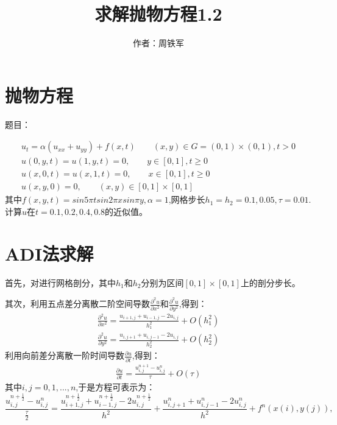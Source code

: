 \documentclass[12pt,a4paper]{article}
\title{求解抛物方程1.2}
\author{作者：周铁军}
\date{\chntoday}
\begin{document}
\maketitle
\newpage
\section{抛物方程}
 题目：
 
 \begin{equation}
  \begin{array}{l}{ u_t = \alpha(u_{xx}+u_{yy})+f(x,t) \qquad (x,y) \in G=(0,1)\times(0,1),t > 0}\\
  {u(0,y,t) = u(1,y,t)=0,\qquad y \in [0,1],t \geq 0 }\\
  {u(x,0,t) = u(x,1,t)=0,\qquad x \in [0,1],t \geq 0}\\
  {u(x,y,0)=0,\qquad (x,y) \in [0,1] \times [0,1]}\end{array}
 \end{equation}
其中$f(x,y,t) = sin{5 \pi t}sin{2 \pi x}sin{\pi y},\alpha = 1$,网格步长$h_1 = h_2 = 0.1,0.05,\tau =0.01$.计算$u$在$t=0.1,0.2,0.4,0.8$的近似值。

\section{ADI法求解}
首先，对进行网格剖分，其中$h_1$和$h_2$分别为区间$[0,1]\times[0,1]$上的剖分步长。

其次，利用五点差分离散二阶空间导数$\frac{\partial^2 u}{\partial x^2}$和$\frac{\partial^2 u}{\partial y^2}$,得到：
\begin{equation}
\begin{array}{l}{\frac{\partial^2 u}{\partial x^2} = \frac{u_{i+1,j}+u_{i-1,j}-2u_{i,j}}{h_1^2} + O(h_1^2)}\\
{\frac{\partial^2 u}{\partial y^2} = \frac{u_{i,j+1}+u_{i,j-1}-2u_{i,j}}{h_2^2}+ O(h_2^2)}\end{array}
\end{equation}
利用向前差分离散一阶时间导数$\frac{\partial u}{\partial t}$,得到：
\begin{equation}
\begin{array}{l}{\frac{\partial u}{\partial t} = \frac{u^{n+1}_{i,j}-u^n_{i,j}}{\tau} + O(\tau)}\end{array}
\end{equation}
其中$i,j=0,1,...,n$,于是方程可表示为：
$$\frac{u^{n+\frac{1}{2}}_{i,j}-u^n_{i,j}}{\frac{\tau}{2}}=\frac{u^{n+\frac{1}{2}}_{i+1,j}+u^{n+\frac{1}{2}}_{i-1,j}-2u^{n+\frac{1}{2}}_{i,j}}{h^2}+\frac{u^n_{i,j+1}+u^n_{i,j-1}-2u^n_{i,j}}{h^2} + f^n(x(i),y(j)),$$
\end{document}

